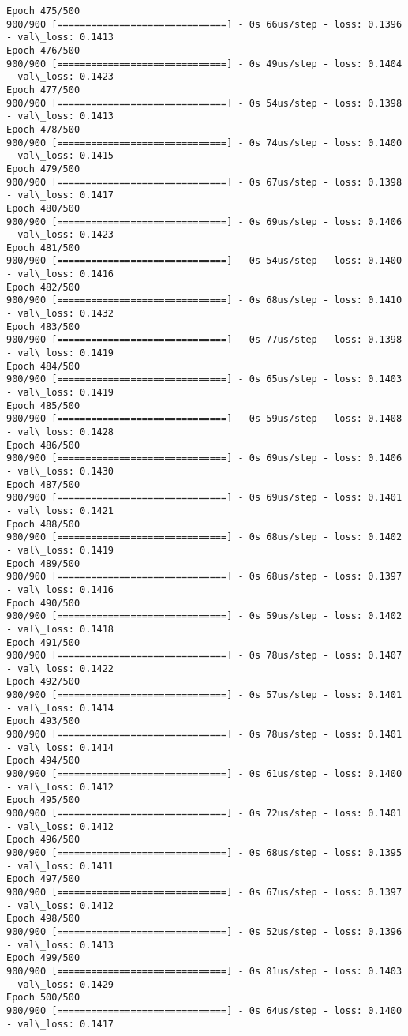 \documentclass[11pt]{article}
\begin{document}
\begin{Verbatim}[commandchars=\\\{\}]
Epoch 475/500
900/900 [==============================] - 0s 66us/step - loss: 0.1396 - val\_loss: 0.1413
Epoch 476/500
900/900 [==============================] - 0s 49us/step - loss: 0.1404 - val\_loss: 0.1423
Epoch 477/500
900/900 [==============================] - 0s 54us/step - loss: 0.1398 - val\_loss: 0.1413
Epoch 478/500
900/900 [==============================] - 0s 74us/step - loss: 0.1400 - val\_loss: 0.1415
Epoch 479/500
900/900 [==============================] - 0s 67us/step - loss: 0.1398 - val\_loss: 0.1417
Epoch 480/500
900/900 [==============================] - 0s 69us/step - loss: 0.1406 - val\_loss: 0.1423
Epoch 481/500
900/900 [==============================] - 0s 54us/step - loss: 0.1400 - val\_loss: 0.1416
Epoch 482/500
900/900 [==============================] - 0s 68us/step - loss: 0.1410 - val\_loss: 0.1432
Epoch 483/500
900/900 [==============================] - 0s 77us/step - loss: 0.1398 - val\_loss: 0.1419
Epoch 484/500
900/900 [==============================] - 0s 65us/step - loss: 0.1403 - val\_loss: 0.1419
Epoch 485/500
900/900 [==============================] - 0s 59us/step - loss: 0.1408 - val\_loss: 0.1428
Epoch 486/500
900/900 [==============================] - 0s 69us/step - loss: 0.1406 - val\_loss: 0.1430
Epoch 487/500
900/900 [==============================] - 0s 69us/step - loss: 0.1401 - val\_loss: 0.1421
Epoch 488/500
900/900 [==============================] - 0s 68us/step - loss: 0.1402 - val\_loss: 0.1419
Epoch 489/500
900/900 [==============================] - 0s 68us/step - loss: 0.1397 - val\_loss: 0.1416
Epoch 490/500
900/900 [==============================] - 0s 59us/step - loss: 0.1402 - val\_loss: 0.1418
Epoch 491/500
900/900 [==============================] - 0s 78us/step - loss: 0.1407 - val\_loss: 0.1422
Epoch 492/500
900/900 [==============================] - 0s 57us/step - loss: 0.1401 - val\_loss: 0.1414
Epoch 493/500
900/900 [==============================] - 0s 78us/step - loss: 0.1401 - val\_loss: 0.1414
Epoch 494/500
900/900 [==============================] - 0s 61us/step - loss: 0.1400 - val\_loss: 0.1412
Epoch 495/500
900/900 [==============================] - 0s 72us/step - loss: 0.1401 - val\_loss: 0.1412
Epoch 496/500
900/900 [==============================] - 0s 68us/step - loss: 0.1395 - val\_loss: 0.1411
Epoch 497/500
900/900 [==============================] - 0s 67us/step - loss: 0.1397 - val\_loss: 0.1412
Epoch 498/500
900/900 [==============================] - 0s 52us/step - loss: 0.1396 - val\_loss: 0.1413
Epoch 499/500
900/900 [==============================] - 0s 81us/step - loss: 0.1403 - val\_loss: 0.1429
Epoch 500/500
900/900 [==============================] - 0s 64us/step - loss: 0.1400 - val\_loss: 0.1417

    \end{Verbatim}
\end{document}
